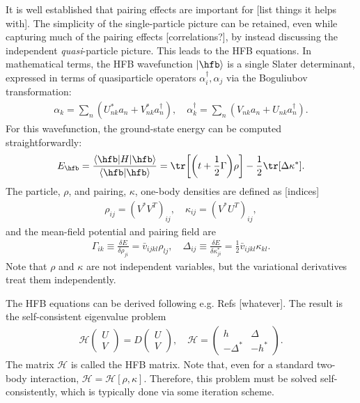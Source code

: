 \documentclass[../thesis.tex]{subfiles}
\begin{document}
It is well established that pairing effects are important for [list things it helps with]. The simplicity of the single-particle picture can be retained, even while capturing much of the pairing effects [correlations?], by instead discussing the independent \textit{quasi}-particle picture. This leads to the HFB equations. In mathematical terms, the HFB wavefunction $|\hfb\rangle$ is a single Slater determinant, expressed in terms of quasiparticle operators $\alpha_i^\dagger,\alpha_j$ via the Boguliubov transformation:
\begin{align}
	\alpha_k=\sum_n(U_{nk}^*a_n+V_{nk}^*a_n^\dagger),\quad \alpha_k^\dagger=\sum_n(V_{nk}a_n+U_{nk}a_n^\dagger).
\end{align}
For this wavefunction, the ground-state energy can be computed straightforwardly:
\begin{align}
	E_\hfb=\frac{\langle\hfb|H|\hfb\rangle}{\langle\hfb|\hfb\rangle}=\tr\bigg[\bigg(t+\frac{1}{2}\Gamma\bigg)\rho\bigg]-\frac{1}{2}\tr[\Delta\kappa^*].
\end{align}
The particle, $\rho$, and pairing, $\kappa$, one-body densities are defined as [indices]
\begin{align}
	\rho_{ij}=(V^*V^T)_{ij},\quad \kappa_{ij}=(V^*U^T)_{ij},
\end{align}
and the mean-field potential and pairing field are
\begin{align}
	\Gamma_{ik}\equiv\frac{\delta E}{\delta\rho_{ji}}=\bar{v}_{ijkl}\rho_{lj},\quad \Delta_{ij}\equiv\frac{\delta E}{\delta\kappa^*_{ji}}=\frac{1}{2}\bar{v}_{ijkl}\kappa_{kl}.
\end{align}
Note that $\rho$ and $\kappa$ are not independent variables, but the variational derivatives treat them independently.

The HFB equations can be derived following e.g. Refs [whatever]. The result is the self-consistent eigenvalue problem
\begin{align}
	\mathcal{H}\begin{pmatrix}
		U\\V
	\end{pmatrix}=D\begin{pmatrix}
		U\\V
	\end{pmatrix},\quad 
	\mathcal{H}=
	\begin{pmatrix}
		h & \Delta \\ -\Delta^* & -h^*
	\end{pmatrix}.
\end{align}
The matrix $\mathcal{H}$ is called the HFB matrix. Note that, even for a standard two-body interaction, $\mathcal{H}=\mathcal{H}[\rho,\kappa]$. Therefore, this problem must be solved self-consistently, which is typically done via some iteration scheme.
\end{document}
